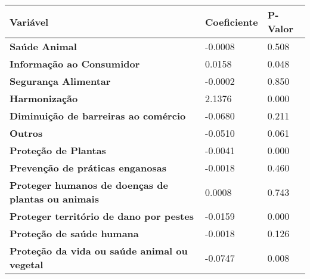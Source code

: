 \begin{table}[h]
    \begin{tabular}{@{}lll@{}}
    \toprule
    \textbf{Variável}                                                                       & \textbf{Coeficiente}         & \textbf{P-Valor} \\ \midrule
    \multicolumn{1}{l|}{\textbf{Saúde Animal}}                                             & \multicolumn{1}{l|}{-0.0008} & 0.508           \\ \midrule
    \multicolumn{1}{l|}{\textbf{Informação ao Consumidor}}                                      & \multicolumn{1}{l|}{0.0158}  & 0.048            \\ \midrule
    \multicolumn{1}{l|}{\textbf{Segurança Alimentar}}                                               & \multicolumn{1}{l|}{-0.0002} & 0.850           \\ \midrule
    \multicolumn{1}{l|}{\textbf{Harmonização}}                                             & \multicolumn{1}{l|}{2.1376}  & 0.000           \\ \midrule
    \multicolumn{1}{l|}{\textbf{Diminuição de barreiras ao comércio}}                                   & \multicolumn{1}{l|}{-0.0680} & 0.211           \\ \midrule
    \multicolumn{1}{l|}{\textbf{Outros}}                                                     & \multicolumn{1}{l|}{-0.0510} & 0.061           \\ \midrule
    \multicolumn{1}{l|}{\textbf{Proteção de Plantas}}                                          & \multicolumn{1}{l|}{-0.0041} & 0.000           \\ \midrule
    \multicolumn{1}{l|}{\textbf{Prevenção de práticas enganosas}} & \multicolumn{1}{l|}{-0.0018} & 0.460           \\ \midrule
    \multicolumn{1}{l|}{\textbf{Proteger humanos de doenças de plantas ou animais}}          & \multicolumn{1}{l|}{0.0008}  & 0.743            \\ \midrule
    \multicolumn{1}{l|}{\textbf{Proteger território de dano por pestes}}            & \multicolumn{1}{l|}{-0.0159} & 0.000           \\ \midrule
    \multicolumn{1}{l|}{\textbf{Proteção de saúde humana}}                      & \multicolumn{1}{l|}{-0.0018} & 0.126           \\ \midrule
    \multicolumn{1}{l|}{\textbf{Proteção da vida ou saúde animal ou vegetal}}              & \multicolumn{1}{l|}{-0.0747} & 0.008           \\ \midrule

\end{tabular}
\end{table}
